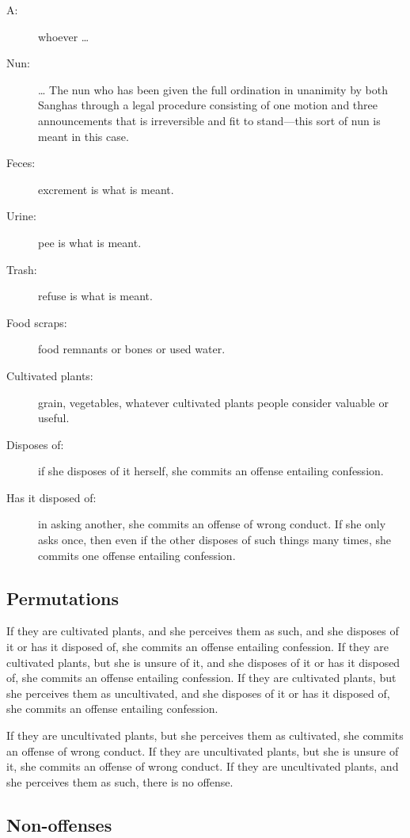 \documentclass[12pt,openany]{book}%
\begin{document}
\begin{description}%
\item[A: ] whoever … %
\item[Nun: ] … The nun who has been given the full ordination in unanimity by both Sanghas through a legal procedure consisting of one motion and three announcements that is irreversible and fit to stand—this sort of nun is meant in this case. %
\item[Feces: ] excrement is what is meant. %
\item[Urine: ] pee is what is meant. %
\item[Trash: ] refuse is what is meant. %
\item[Food scraps: ] food remnants or bones or used water. %
\item[Cultivated plants: ] grain, vegetables, whatever cultivated plants people consider valuable or useful. %
\item[Disposes of: ] if she disposes of it herself, she commits an offense entailing confession. %
\item[Has it disposed of: ] in asking another, she commits an offense of wrong conduct. If she only asks once, then even if the other disposes of such things many times, she commits one offense entailing confession. %
\end{description}

\subsection*{Permutations }

If they are cultivated plants, and she perceives them as such, and she disposes of it or has it disposed of, she commits an offense entailing confession. If they are cultivated plants, but she is unsure of it, and she disposes of it or has it disposed of, she commits an offense entailing confession. If they are cultivated plants, but she perceives them as uncultivated, and she disposes of it or has it disposed of, she commits an offense entailing confession. 

If they are uncultivated plants, but she perceives them as cultivated, she commits an offense of wrong conduct. If they are uncultivated plants, but she is unsure of it, she commits an offense of wrong conduct. If they are uncultivated plants, and she perceives them as such, there is no offense. 

\subsection*{Non-offenses }
\end{document}
